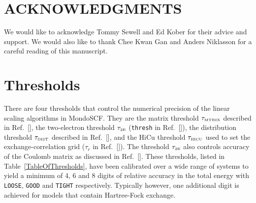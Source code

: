 \documentclass[prb,aps,nobibnotes,twocolumn,doublespace,twocolumngrid,superbib,showpacs]{revtex4}
\begin{document}
\section*{ACKNOWLEDGMENTS}

We would like to acknowledge Tommy Sewell and Ed Kober for their advice
and support. We would also like to thank Chee Kwan Gan and Anders Niklasson 
for a careful reading of this manuscript.  

 
 

\appendix

\section{Thresholds}\label{Thresholds}

There are four thresholds that control the numerical precision of the linear scaling algorithms
in {\sc MondoSCF}.  They are the matrix threshold $\tau_{\rm \scriptscriptstyle MTRIX}$
described in Ref.~[], the two-electron threshold  $\tau_{\rm \scriptscriptstyle 2E}$ ({\tt thresh} in Ref.~[]),
the distribution threshold   $\tau_{\rm \scriptscriptstyle DIST}$ described in Ref.~[],
and the HiCu threshold $\tau_{\rm \scriptscriptstyle HICU}$ used to set the exchange-correlation grid ($\tau_r$ in 
Ref.~[]).  The threshold $\tau_{\rm \scriptscriptstyle 2E}$ also controls accuracy of the
Coulomb matrix as discussed in Ref.~[].
These thresholds, listed in Table~\ref{TableOfThresholds},  have been 
calibrated over a wide range of systems to yield a minimum of  4, 6 and 8 digits of relative accuracy in the total 
energy with {\tt LOOSE}, {\tt GOOD} and {\tt TIGHT} respectively.    Typically however, one additional digit is achieved for 
models that contain Hartree-Fock exchange.

\begin{table}[h]
\caption{Accuracy goals and corresponding thresholds that control precision of the {\sc MondoSCF} linear scaling algorithms.}
\label{TableOfThresholds}
\end{table}
\end{document}
